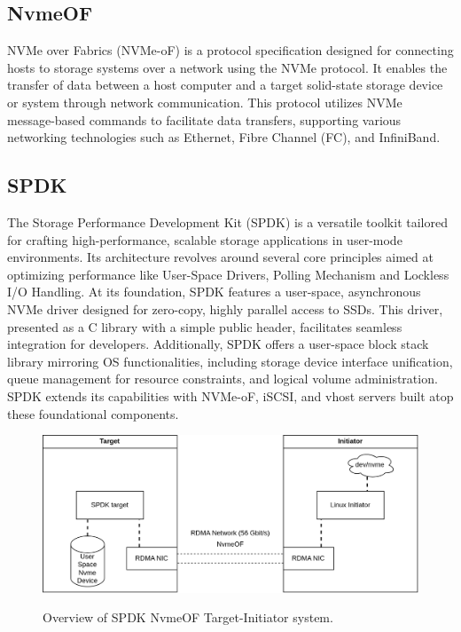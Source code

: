 \vspace{1em}
\subsection{NvmeOF}
NVMe over Fabrics (NVMe-oF) is a protocol specification designed for connecting hosts to storage systems over a network using the NVMe protocol. It enables the transfer of data between a host computer and a target solid-state storage device or system through network communication. This protocol utilizes NVMe message-based commands to facilitate data transfers, supporting various networking technologies such as Ethernet, Fibre Channel (FC), and InfiniBand.

\vspace{1em}
\subsection{SPDK}
The Storage Performance Development Kit (SPDK) is a versatile toolkit tailored for crafting high-performance, scalable storage applications in user-mode environments. Its architecture revolves around several core principles aimed at optimizing performance like User-Space Drivers, Polling Mechanism and Lockless I/O Handling. At its foundation, SPDK features a user-space, asynchronous NVMe driver designed for zero-copy, highly parallel access to SSDs. This driver, presented as a C library with a simple public header, facilitates seamless integration for developers. Additionally, SPDK offers a user-space block stack library mirroring OS functionalities, including storage device interface unification, queue management for resource constraints, and logical volume administration.
SPDK extends its capabilities with NVMe-oF, iSCSI, and vhost servers built atop these foundational components.
\begin{figure}[h]
\includegraphics[scale=0.25]{figures/spdk-target.png}\\
\caption{Overview of SPDK NvmeOF Target-Initiator system.}
\end{figure}

